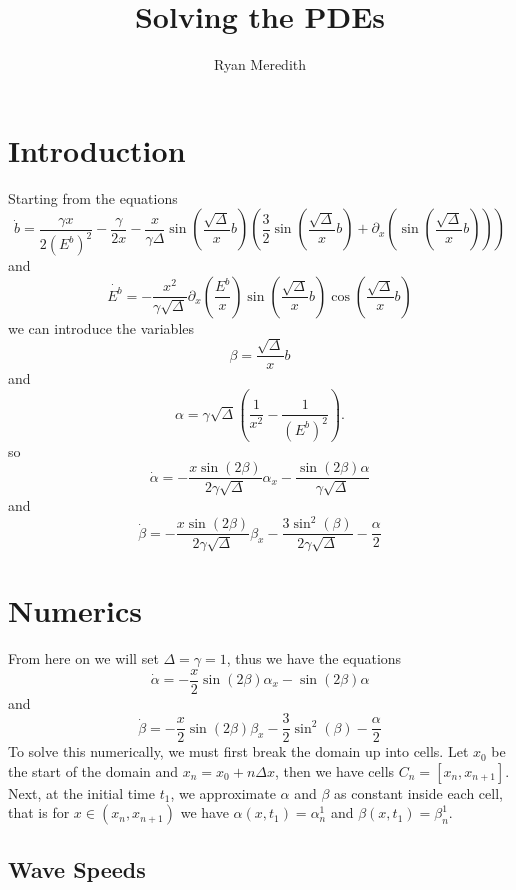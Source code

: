 \documentclass[12pt]{article}
\title{Solving the PDEs}
\author{Ryan Meredith}
\begin{document}
\maketitle

\section{Introduction}

Starting from the equations
\[ \dot{b} = \frac{\gamma x}{2(E^b)^2} - \frac{\gamma}{2x} - \frac{x}{\gamma\Delta} \sin\left(
\frac{\sqrt{\Delta}}{x}b \right) \left( \frac{3}{2}\sin\left( \frac{\sqrt{\Delta}}{x}b \right) +
\partial_x \left( \sin\left(\frac{\sqrt{\Delta}}{x}b\right) \right) \right) \]
and
\[ \dot{E^b} = -\frac{x^2}{\gamma\sqrt{\Delta}} \partial_x \left( \frac{E^b}{x} \right) \sin \left(
\frac{\sqrt{\Delta}}{x}b \right) \cos \left( \frac{\sqrt{\Delta}}{x}b \right) \]
we can introduce the variables
\[ \beta = \frac{\sqrt{\Delta}}{x}b \]
and
\[ \alpha = \gamma\sqrt{\Delta} \left( \frac{1}{x^2} - \frac{1}{(E^b)^2} \right). \]
so
\[ \dot{\alpha} = -\frac{x\sin(2\beta)}{2\gamma\sqrt{\Delta}}\alpha_x -
\frac{\sin(2\beta)\alpha}{\gamma\sqrt{\Delta}} \]
and
\[ \dot{\beta} = -\frac{x\sin(2\beta)}{2\gamma\sqrt{\Delta}}\beta_x -
\frac{3\sin^2(\beta)}{2\gamma\sqrt{\Delta}} - \frac{\alpha}{2} \]

\section{Numerics}

From here on we will set $\Delta=\gamma=1$, thus we have the equations
\[ \dot{\alpha} = -\frac{x}{2}\sin(2\beta)\alpha_x - \sin(2\beta)\alpha \]
and
\[ \dot{\beta} = -\frac{x}{2}\sin(2\beta)\beta_x - \frac{3}{2}\sin^2(\beta) - \frac{\alpha}{2} \]
To solve this numerically, we must first break the domain up into cells. Let $x_0$ be the start of
the domain and $x_n = x_0 + n\Delta x$, then we have cells $C_n = [x_n,x_{n+1}]$. Next, at the
initial time $t_1$, we approximate $\alpha$ and $\beta$ as constant inside each cell, that is for
$x\in(x_n,x_{n+1})$ we have $\alpha(x,t_1)=\alpha_n^1$ and $\beta(x,t_1) = \beta_n^1$.

\subsection{Wave Speeds}
\end{document}
